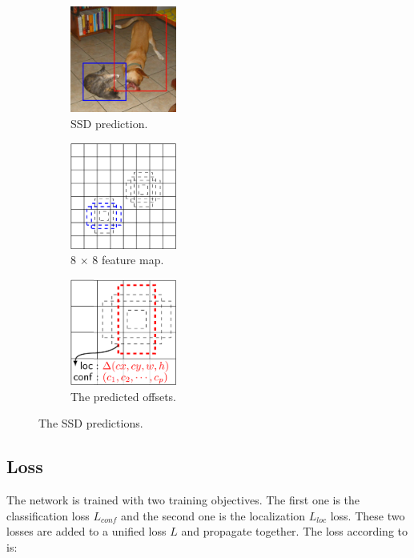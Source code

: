 \documentclass[a4paper,11pt,titlepage,twoside]{article}
\numberwithin{figure}{section}
\begin{document}
\begin{figure}
    \begin{subfigure}[Sample1]{0.3\linewidth}
        \includegraphics[height=35mm, width=35mm]{fig/ssd_dog_cat.png} 
        \caption{SSD prediction.}
        \label{fig:ssd_detection}   
    \end{subfigure}
    \quad
    \begin{subfigure}[Sample1]{0.3\linewidth} 
        \includegraphics[height=35mm, width=35mm]{fig/ssd_feature_map.png}
        \caption{8 $\times$ 8 feature map.}   
        \label{fig:ssd4}
    \end{subfigure} 
    \quad
    \begin{subfigure}[Sample1]{0.3\linewidth} 
        \includegraphics[height=35mm, width=35mm]{fig/ssd_4_feature_map.png}
        \caption{The predicted offsets.}   
        \label{fig:ssd8}
    \end{subfigure} 
    \caption{The SSD \cite{liu2016ssd} predictions.}
\end{figure}

\subsection{Loss}
The network is trained with two training objectives. The first one is the classification loss $L_{conf}$ and the second one is the localization $L_{loc}$ loss. These two losses are added to a unified loss $L$ and propagate together. The loss according to \cite{li2017fssd} is:
\end{document}
